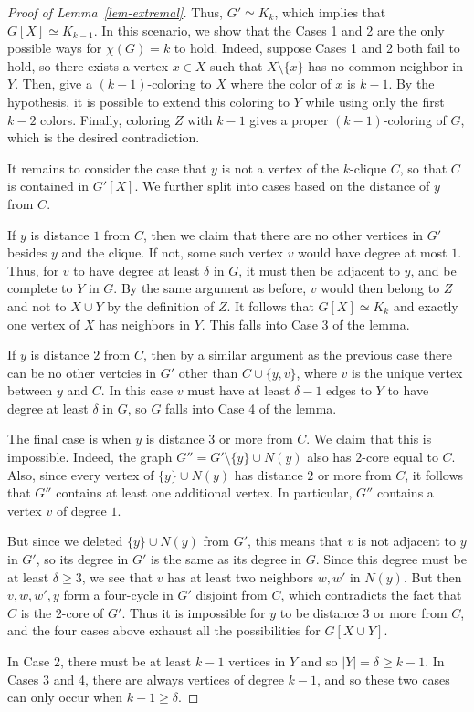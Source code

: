 \documentclass[11pt]{article}
\theoremstyle{plain}
\theoremstyle{definition}
\theoremstyle{remark}
\begin{document}
\begin{proof}[Proof of Lemma~\ref{lem-extremal}]
Thus, $G'\simeq K_k$, which implies that $G[X]\simeq K_{k-1}$. In this scenario, we show that the Cases 1 and 2 are the only possible ways for $\chi(G)=k$ to hold. Indeed, suppose Cases 1 and 2 both fail to hold, so there exists a vertex $x\in X$ such that $X \setminus \{x\}$ has no common neighbor in $Y$. Then, give a $(k-1)$-coloring to $X$ where the color of $x$ is $k-1$. By the hypothesis, it is possible to extend this coloring to $Y$ while using only the first $k-2$ colors. Finally, coloring $Z$ with $k-1$ gives a proper $(k-1)$-coloring of $G$, which is the desired contradiction.

It remains to consider the case that $y$ is not a vertex of the $k$-clique $C$, so that $C$ is contained in $G'[X]$. We further split into cases based on the distance of $y$ from $C$. 

If $y$ is distance $1$ from $C$, then we claim that there are no other vertices in $G'$ besides $y$ and the clique. If not, some such vertex $v$ would have degree at most $1$. Thus, for $v$ to have degree at least $\delta$ in $G$, it must then be adjacent to $y$, and be complete to $Y$ in $G$. By the same argument as before, $v$ would then belong to $Z$ and not to $X\cup Y$ by the definition of $Z$. It follows that $G[X]\simeq K_k$ and exactly one vertex of $X$ has neighbors in $Y$. This falls into Case 3 of the lemma.

If $y$ is distance $2$ from $C$, then by a similar argument as the previous case there can be no other vertcies in $G'$ other than $C\cup \{y,v\}$, where $v$ is the unique vertex between $y$ and $C$. In this case $v$ must have at least $\delta-1$ edges to $Y$ to have degree at least $\delta$ in $G$, so $G$ falls into Case 4 of the lemma.

The final case is when $y$ is distance $3$ or more from $C$. We claim that this is impossible. Indeed, the graph $G''=G'\setminus \{y\}\cup N(y)$ also has $2$-core equal to $C$. Also, since every vertex of $\{y\}\cup N(y)$ has distance $2$ or more from $C$, it follows that $G''$ contains at least one additional vertex. In particular, $G''$ contains a vertex $v$ of degree $1$.

But since we deleted $\{y\}\cup N(y)$ from $G'$, this means that $v$ is not adjacent to $y$ in $G'$, so its degree in $G'$ is the same as its degree in $G$. Since this degree must be at least $\delta \ge 3$, we see that $v$ has at least two neighbors $w, w'$ in $N(y)$. But then $v, w, w', y$ form a four-cycle in $G'$ disjoint from $C$, which contradicts the fact that $C$ is the $2$-core of $G'$. Thus it is impossible for $y$ to be distance $3$ or more from $C$, and the four cases above exhaust all the possibilities for $G[X\cup Y]$.

In Case 2, there must be at least $k-1$ vertices in $Y$ and so $|Y|=\delta \geq k-1$. In Cases 3 and 4, there are always vertices of degree $k-1$, and so these two cases can only occur when $k-1 \ge \delta$.
\end{proof}
\end{document}
